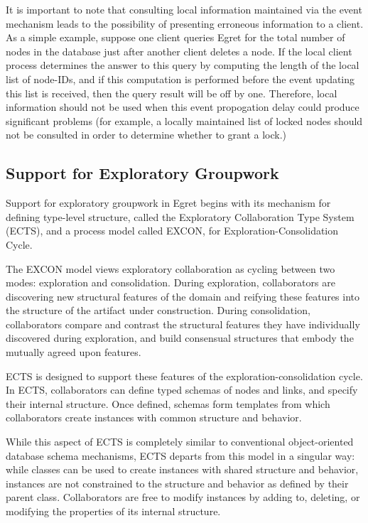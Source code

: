 It is important to note that consulting local information maintained
via the event mechanism leads to the possibility of presenting
erroneous information to a client.  As a simple example, suppose one
client queries Egret for the total number of nodes in the database
just after another client deletes a node. If the local client process
determines the answer to this query by computing the length of the
local list of node-IDs, and if this computation is performed before
the event updating this list is received, then the query result will
be off by one.  Therefore, local information should not be used when
this event propogation delay could produce significant problems (for
example, a locally maintained list of locked nodes should not be
consulted in order to determine whether to grant a lock.)

\subsection{Support for Exploratory Groupwork}

Support for exploratory groupwork in Egret begins with its mechanism for
defining type-level structure, called the Exploratory Collaboration Type
System (ECTS), and a process model called EXCON, for 
Exploration-Consolidation Cycle.

The EXCON model views exploratory collaboration as cycling between two
modes: exploration and consolidation.  During exploration, collaborators are
discovering new structural features of the domain and reifying these features
into the structure of the artifact under construction.  During consolidation,
collaborators compare and contrast the structural features they have
individually discovered during exploration, and build consensual structures
that embody the mutually agreed upon features.

ECTS is designed to support these features of the exploration-consolidation
cycle.  In ECTS, collaborators can define typed schemas of nodes and links, and
specify their internal structure.  Once defined, schemas form templates from
which collaborators create instances with common structure and behavior.

While this aspect of ECTS is completely similar to conventional
object-oriented database schema mechanisms, ECTS departs from this model
in a singular way: while classes can be used to create instances with shared
structure and behavior, instances are not constrained to the structure and
behavior as defined by their parent class. Collaborators are free to modify
instances by adding to, deleting, or modifying the properties of its internal
structure.

